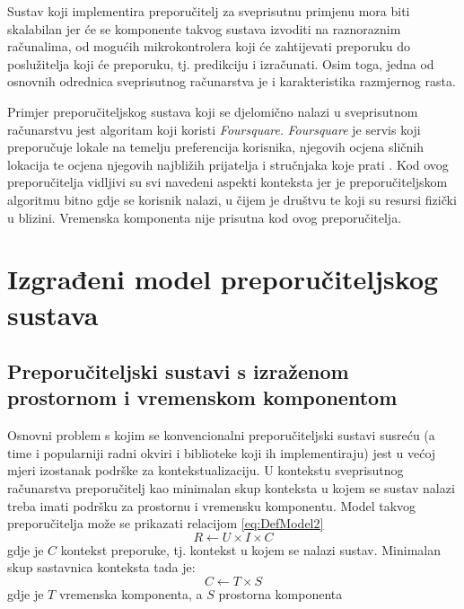 \documentclass[times, utf8, diplomski, numeric]{fer}
\begin{document}
Sustav koji implementira preporučitelj za sveprisutnu primjenu mora biti
skalabilan jer će se komponente takvog sustava izvoditi na raznoraznim
računalima, od mogućih mikrokontrolera koji će zahtijevati preporuku do
poslužitelja koji će preporuku, tj. predikciju i izračunati. Osim toga, jedna od
osnovnih odrednica sveprisutnog računarstva je i karakteristika razmjernog
rasta.

Primjer preporučiteljskog sustava koji se djelomično nalazi u sveprisutnom
računarstvu jest algoritam koji koristi \emph{Foursquare}. \emph{Foursquare} je
servis koji preporučuje lokale na temelju preferencija korisnika, njegovih
ocjena sličnih lokacija te ocjena njegovih najbližih prijatelja i stručnjaka
koje prati \cite{FoursquareAbout}. Kod ovog preporučitelja vidljivi su svi
navedeni aspekti konteksta jer je preporučiteljskom algoritmu bitno gdje se
korisnik nalazi, u čijem je društvu te koji su resursi fizički u blizini.
Vremenska komponenta nije prisutna kod ovog preporučitelja.

\chapter{Izgrađeni model preporučiteljskog sustava}


\section{Preporučiteljski sustavi s izraženom prostornom i vremenskom
komponentom}

Osnovni problem s kojim se konvencionalni preporučiteljski sustavi susreću (a
time i popularniji radni okviri i biblioteke koji ih implementiraju) jest
u većoj mjeri izostanak podrške za kontekstualizaciju. U kontekstu sveprisutnog
računarstva preporučitelj kao minimalan skup konteksta u kojem se sustav nalazi
treba imati podršku za prostornu i vremensku komponentu. Model takvog
preporučitelja može se prikazati relacijom \ref{eq:DefModel2}
\begin{equation}
\label{eq:DefModel2}
	R \leftarrow U \times I \times C
\end{equation}
gdje je $C$ kontekst preporuke, tj. kontekst u kojem se nalazi sustav. Minimalan
skup sastavnica konteksta tada je:
\begin{equation}
\label{eq:Context}
	C \leftarrow T \times S
\end{equation}
gdje je $T$ vremenska komponenta, a $S$ prostorna komponenta
\end{document}
